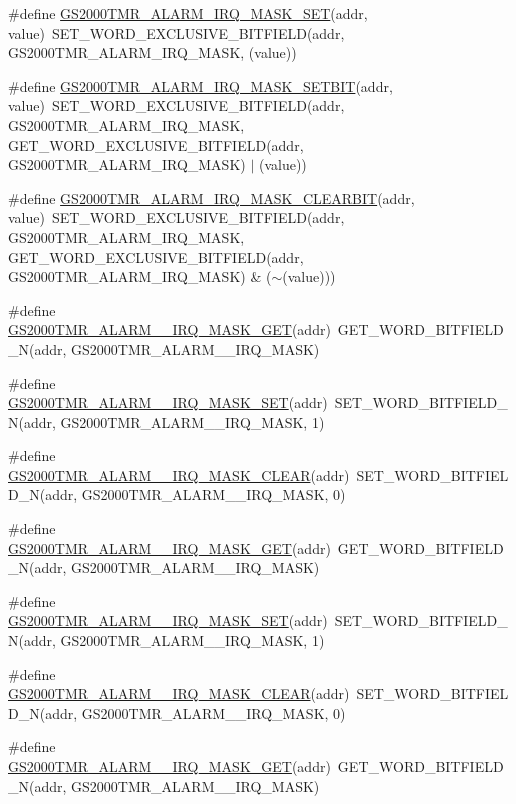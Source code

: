 \begin{DoxyCompactItemize}
\item 
\#define \hyperlink{a00555_ab42472d22bd9f283e74ee416fddd7725}{GS2000TMR\_\-ALARM\_\-IRQ\_\-MASK\_\-SET}(addr, value)~SET\_\-WORD\_\-EXCLUSIVE\_\-BITFIELD(addr, GS2000TMR\_\-ALARM\_\-IRQ\_\-MASK, (value))
\item 
\#define \hyperlink{a00555_af6d92699aa8c392884fbb78362c1c637}{GS2000TMR\_\-ALARM\_\-IRQ\_\-MASK\_\-SETBIT}(addr, value)~SET\_\-WORD\_\-EXCLUSIVE\_\-BITFIELD(addr, GS2000TMR\_\-ALARM\_\-IRQ\_\-MASK, GET\_\-WORD\_\-EXCLUSIVE\_\-BITFIELD(addr, GS2000TMR\_\-ALARM\_\-IRQ\_\-MASK) $|$ (value))
\item 
\#define \hyperlink{a00555_a7d62dcf039af18d7a47cf52676ae05b5}{GS2000TMR\_\-ALARM\_\-IRQ\_\-MASK\_\-CLEARBIT}(addr, value)~SET\_\-WORD\_\-EXCLUSIVE\_\-BITFIELD(addr, GS2000TMR\_\-ALARM\_\-IRQ\_\-MASK, GET\_\-WORD\_\-EXCLUSIVE\_\-BITFIELD(addr, GS2000TMR\_\-ALARM\_\-IRQ\_\-MASK) \& ($\sim$(value)))
\item 
\#define \hyperlink{a00555_aee4711e134a065cb407e6c5316b743af}{GS2000TMR\_\-ALARM\_\_\-IRQ\_\-MASK\_\-GET}(addr)~GET\_\-WORD\_\-BITFIELD\_\-N(addr, GS2000TMR\_\-ALARM\_\_\-IRQ\_\-MASK)
\item 
\#define \hyperlink{a00555_ad56c81cf79053fefda790626abef5d87}{GS2000TMR\_\-ALARM\_\_\-IRQ\_\-MASK\_\-SET}(addr)~SET\_\-WORD\_\-BITFIELD\_\-N(addr, GS2000TMR\_\-ALARM\_\_\-IRQ\_\-MASK, 1)
\item 
\#define \hyperlink{a00555_a43da0679a158eb809a13cac0a3f8d545}{GS2000TMR\_\-ALARM\_\_\-IRQ\_\-MASK\_\-CLEAR}(addr)~SET\_\-WORD\_\-BITFIELD\_\-N(addr, GS2000TMR\_\-ALARM\_\_\-IRQ\_\-MASK, 0)
\item 
\#define \hyperlink{a00555_a66a480a744cb1da1164a95a05b9f2f74}{GS2000TMR\_\-ALARM\_\_\-IRQ\_\-MASK\_\-GET}(addr)~GET\_\-WORD\_\-BITFIELD\_\-N(addr, GS2000TMR\_\-ALARM\_\_\-IRQ\_\-MASK)
\item 
\#define \hyperlink{a00555_a08d24bb59b201710ccd1d24d9387ca1a}{GS2000TMR\_\-ALARM\_\_\-IRQ\_\-MASK\_\-SET}(addr)~SET\_\-WORD\_\-BITFIELD\_\-N(addr, GS2000TMR\_\-ALARM\_\_\-IRQ\_\-MASK, 1)
\item 
\#define \hyperlink{a00555_abb77611d6033f345295cfcc08b17a649}{GS2000TMR\_\-ALARM\_\_\-IRQ\_\-MASK\_\-CLEAR}(addr)~SET\_\-WORD\_\-BITFIELD\_\-N(addr, GS2000TMR\_\-ALARM\_\_\-IRQ\_\-MASK, 0)
\item 
\#define \hyperlink{a00555_a2ee01b8d874d75edd2925d560bdc150f}{GS2000TMR\_\-ALARM\_\_\-IRQ\_\-MASK\_\-GET}(addr)~GET\_\-WORD\_\-BITFIELD\_\-N(addr, GS2000TMR\_\-ALARM\_\_\-IRQ\_\-MASK)

\end{DoxyCompactItemize}
